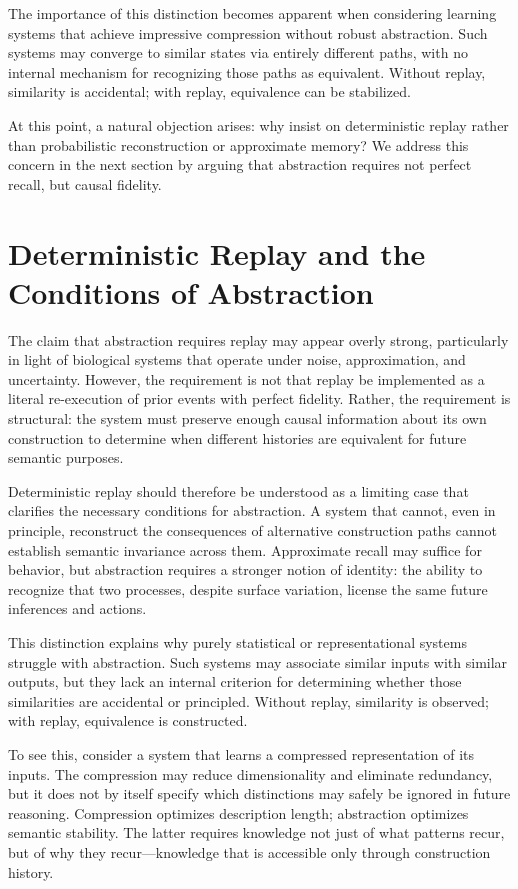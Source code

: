\documentclass[11pt]{article}
\begin{document}
The importance of this distinction becomes apparent when considering learning systems that achieve impressive compression without robust abstraction. Such systems may converge to similar states via entirely different paths, with no internal mechanism for recognizing those paths as equivalent. Without replay, similarity is accidental; with replay, equivalence can be stabilized.

At this point, a natural objection arises: why insist on deterministic replay rather than probabilistic reconstruction or approximate memory? We address this concern in the next section by arguing that abstraction requires not perfect recall, but causal fidelity.

\section{Deterministic Replay and the Conditions of Abstraction}

The claim that abstraction requires replay may appear overly strong, particularly in light of biological systems that operate under noise, approximation, and uncertainty. However, the requirement is not that replay be implemented as a literal re-execution of prior events with perfect fidelity. Rather, the requirement is structural: the system must preserve enough causal information about its own construction to determine when different histories are equivalent for future semantic purposes.

Deterministic replay should therefore be understood as a limiting case that clarifies the necessary conditions for abstraction. A system that cannot, even in principle, reconstruct the consequences of alternative construction paths cannot establish semantic invariance across them. Approximate recall may suffice for behavior, but abstraction requires a stronger notion of identity: the ability to recognize that two processes, despite surface variation, license the same future inferences and actions.

This distinction explains why purely statistical or representational systems struggle with abstraction. Such systems may associate similar inputs with similar outputs, but they lack an internal criterion for determining whether those similarities are accidental or principled. Without replay, similarity is observed; with replay, equivalence is constructed.

To see this, consider a system that learns a compressed representation of its inputs. The compression may reduce dimensionality and eliminate redundancy, but it does not by itself specify which distinctions may safely be ignored in future reasoning. Compression optimizes description length; abstraction optimizes semantic stability. The latter requires knowledge not just of what patterns recur, but of why they recur—knowledge that is accessible only through construction history.
\end{document}

